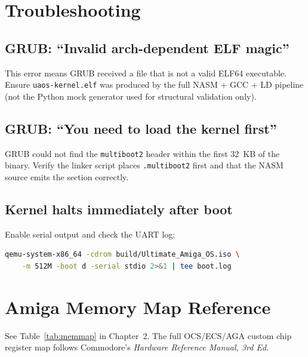 \documentclass[11pt,a4paper]{report}
\begin{document}
\chapter{Troubleshooting}

\section{GRUB: ``Invalid arch-dependent ELF magic''}

This error means GRUB received a file that is not a valid ELF64 executable.
Ensure \texttt{uaos-kernel.elf} was produced by the full NASM + GCC + LD
pipeline (not the Python mock generator used for structural validation only).

\section{GRUB: ``You need to load the kernel first''}

GRUB could not find the \texttt{multiboot2} header within the first 32~KB of
the binary.  Verify the linker script places \texttt{.multiboot2} first and
that the NASM source emits the section correctly.

\section{Kernel halts immediately after boot}

Enable serial output and check the UART log:
\begin{lstlisting}[language=bash]
qemu-system-x86_64 -cdrom build/Ultimate_Amiga_OS.iso \
    -m 512M -boot d -serial stdio 2>&1 | tee boot.log
\end{lstlisting}

\appendix
\chapter{Amiga Memory Map Reference}

See Table~\ref{tab:memmap} in Chapter~2.  The full OCS/ECS/AGA custom chip
register map follows Commodore's \emph{Hardware Reference Manual, 3rd Ed.}
\end{document}
